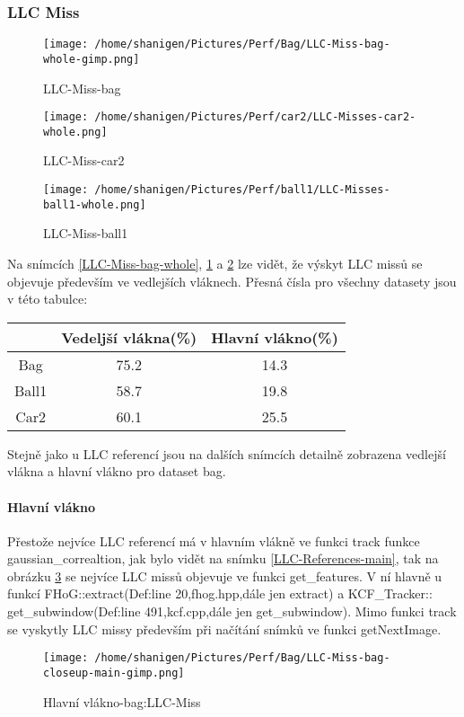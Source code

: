 \documentclass{article}
\begin{document}
\subsubsection{LLC Miss}
\begin{figure}[h!]
	\centering
	\texttt{[image: /home/shanigen/Pictures/Perf/Bag/LLC-Miss-bag-whole-gimp.png]}
	\caption{LLC-Miss-bag}
	\label{LLC-Miss-bag-whole}
	\vspace{0.3cm}
	\centering
	\texttt{[image: /home/shanigen/Pictures/Perf/car2/LLC-Misses-car2-whole.png]}
	\caption{LLC-Miss-car2}
	\label{LLC-Miss-car2-whole}
\end{figure}
\newpage
\begin{figure}[h!]
	\centering
	\texttt{[image: /home/shanigen/Pictures/Perf/ball1/LLC-Misses-ball1-whole.png]}
	\caption{LLC-Miss-ball1}
	\label{LLC-Miss-ball1-whole}
\end{figure}
Na snímcích \ref{LLC-Miss-bag-whole}, \ref{LLC-Miss-car2-whole} a \ref{LLC-Miss-ball1-whole} lze vidět, že výskyt LLC missů se objevuje především ve vedlejších vláknech. Přesná čísla pro všechny datasety jsou v této tabulce:
\begin{center}
	\begin{tabular}{|c|c|c|}
		\hline 
		& Vedeljší vlákna(\%) & Hlavní vlákno(\%) \\ 
		\hline 
		Bag & 75.2 & 14.3 \\ 
		\hline 
		Ball1 & 58.7 & 19.8 \\ 
		\hline 
		Car2 & 60.1 & 25.5 \\ 
		\hline
	\end{tabular}
\end{center}
Stejně jako u LLC referencí jsou na dalších snímcích detailně zobrazena vedlejší vlákna a hlavní vlákno pro dataset bag.
\newpage
\paragraph{Hlavní vlákno}
Přestože nejvíce LLC referencí má v hlavním vlákně ve funkci track funkce gaussian\_correaltion, jak bylo vidět na snímku \ref{LLC-References-main}, tak na obrázku \ref{LLC-Miss-main} se nejvíce LLC missů objevuje ve funkci get\_features. V ní hlavně u funkcí FHoG::extract(Def:line 20,fhog.hpp,dále jen extract) a KCF\_Tracker::
get\_subwindow(Def:line 491,kcf.cpp,dále jen get\_subwindow). Mimo funkci track se vyskytly LLC missy především při načítání snímků ve funkci getNextImage.
\begin{figure}[h!]
	\centering
	\texttt{[image: /home/shanigen/Pictures/Perf/Bag/LLC-Miss-bag-closeup-main-gimp.png]}
	\caption{Hlavní vlákno-bag:LLC-Miss}
	\label{LLC-Miss-main}
\end{figure}
\end{document}

